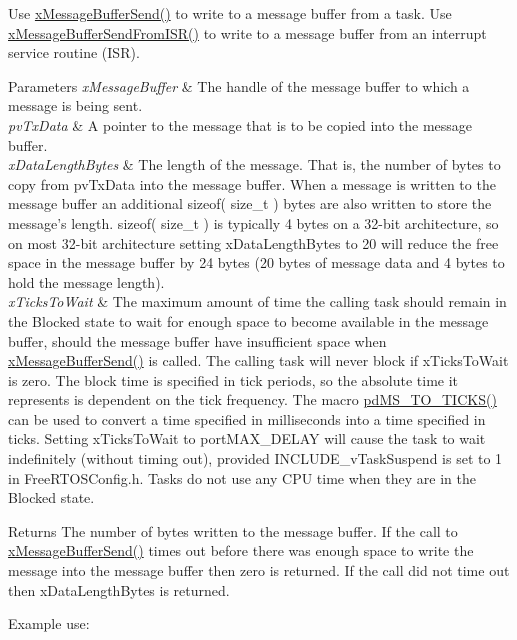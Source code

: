 \begin{DoxyPre}
\begin{DoxyPre}   Use \hyperlink{message__buffer_8h_a858f6da6fe24a226c45caf1634ea1605}{xMessageBufferSend()} to write to a message buffer from a task.  Use
   \hyperlink{message__buffer_8h_aeef5b0c4f8c2db6ca2230a8874813e79}{xMessageBufferSendFromISR()} to write to a message buffer from an interrupt
   service routine (ISR).\end{DoxyPre}
\end{DoxyPre}



\begin{DoxyPre}
\begin{DoxyPre}   
\begin{DoxyParams}{Parameters}
{\em xMessageBuffer} & The handle of the message buffer to which a message is
   being sent.\\
\hline
{\em pvTxData} & A pointer to the message that is to be copied into the
   message buffer.\\
\hline
{\em xDataLengthBytes} & The length of the message.  That is, the number of
   bytes to copy from pvTxData into the message buffer.  When a message is
   written to the message buffer an additional sizeof( size\_t ) bytes are also
   written to store the message's length.  sizeof( size\_t ) is typically 4 bytes
   on a 32-bit architecture, so on most 32-bit architecture setting
   xDataLengthBytes to 20 will reduce the free space in the message buffer by 24
   bytes (20 bytes of message data and 4 bytes to hold the message length).\\
\hline
{\em xTicksToWait} & The maximum amount of time the calling task should remain
   in the Blocked state to wait for enough space to become available in the
   message buffer, should the message buffer have insufficient space when
   \hyperlink{message__buffer_8h_a858f6da6fe24a226c45caf1634ea1605}{xMessageBufferSend()} is called.  The calling task will never block if
   xTicksToWait is zero.  The block time is specified in tick periods, so the
   absolute time it represents is dependent on the tick frequency.  The macro
   \hyperlink{projdefs_8h_a353d0f62b82a402cb3db63706c81ec3f}{pdMS\_TO\_TICKS()} can be used to convert a time specified in milliseconds into
   a time specified in ticks.  Setting xTicksToWait to portMAX\_DELAY will cause
   the task to wait indefinitely (without timing out), provided
   INCLUDE\_vTaskSuspend is set to 1 in FreeRTOSConfig.h.  Tasks do not use any
   CPU time when they are in the Blocked state.\\
\hline
\end{DoxyParams}
\begin{DoxyReturn}{Returns}
The number of bytes written to the message buffer.  If the call to
   \hyperlink{message__buffer_8h_a858f6da6fe24a226c45caf1634ea1605}{xMessageBufferSend()} times out before there was enough space to write the
   message into the message buffer then zero is returned.  If the call did not
   time out then xDataLengthBytes is returned.
\end{DoxyReturn}
Example use:


\end{DoxyPre}
\end{DoxyPre}
